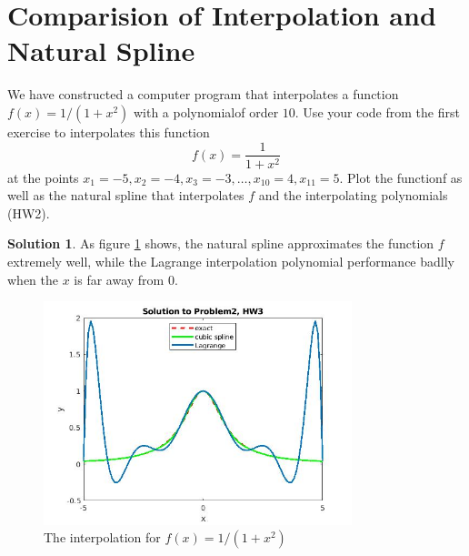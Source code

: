 \documentclass{article}
\theoremstyle{definition}
\newtheorem{solution}{Solution}
\begin{document}
\section{Comparision of Interpolation and Natural Spline}
We have constructed a computer program that interpolates a function $f(x) =1/(1+x^2)$ with a polynomialof order $10$. Use your code from the first exercise to interpolates this function 
\begin{equation}
	f(x) =\frac{1}{1+x^2}
\end{equation}
 at the points $x_1=-5, x_2=-4, x_3=-3,\dots, x_{10}= 4, x_{11}= 5$. Plot the functionf as well as the natural spline that interpolates $f$ and the interpolating polynomials (HW2).


\begin{solution}
	As figure \ref{Fig:solution_to_problem3} shows, the natural spline approximates the function $f$ extremely well, while the Lagrange interpolation polynomial performance badlly when the $x$ is far away from $0$.
	\begin{figure}[ht]
      \label{Fig:solution_to_problem3}
      \includegraphics[width=0.8\textwidth]{solution_to_problem2.jpg}
      \centering
      \caption{The interpolation for $f(x)=1/(1+x^2)$}
    \end{figure}
\end{solution}
\end{document}
